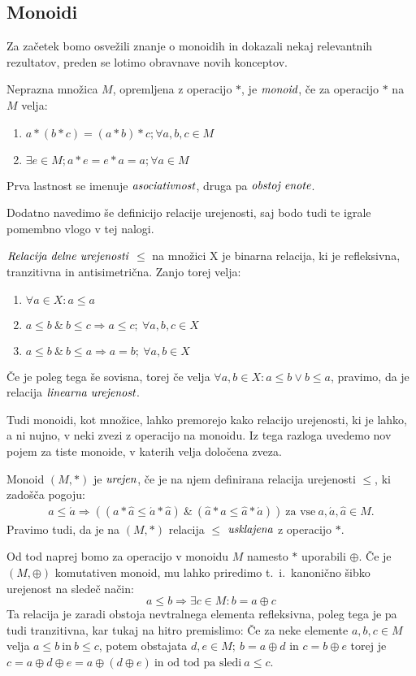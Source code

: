 \documentclass[mat1]{fmfdelo}
\newcommand{\pojem}[1]{\ensuremath{\emph{#1}}}
\begin{document}
\subsection{Monoidi}\label{subsect:monoid}
Za začetek bomo osvežili znanje o monoidih in dokazali nekaj relevantnih rezultatov, preden se lotimo obravnave novih konceptov. 
\begin{definicija}
	Neprazna množica $M$, opremljena z operacijo $\ast$, je \pojem{monoid}, če za operacijo $\ast$ na $M$ velja:
	\begin{enumerate}
		\item $a \ast (b \ast c) = (a\ast b) \ast c;\forall a, b, c \in M$
		\item $\exists e\in M; a \ast e = e\ast a = a;\forall a\in M$
	\end{enumerate}
	Prva lastnost se imenuje \pojem{asociativnost}, druga pa \pojem{obstoj enote}. 
\end{definicija}
Dodatno navedimo še definicijo relacije urejenosti, saj bodo tudi te igrale pomembno vlogo v tej nalogi.
\begin{definicija}
	\pojem{Relacija delne urejenosti} $\leq$ na množici X je binarna relacija, ki je refleksivna, tranzitivna in antisimetrična. Zanjo torej velja:
	\begin{enumerate}
		\item $\forall a \in X: a \leq a$
		\item $a\leq b~\&~b\leq c \Rightarrow a\leq c;~\forall a, b, c\in X$
		\item $a\leq b~\&~b\leq a \Rightarrow a = b;~\forall a, b\in X$
	\end{enumerate}
Če je poleg tega še sovisna, torej če velja $\forall a, b \in X: a \leq b \lor b \leq a$, pravimo, da je relacija \pojem{linearna urejenost}.
\end{definicija}
Tudi monoidi, kot množice, lahko premorejo kako relacijo urejenosti, ki je lahko, a ni nujno, v neki zvezi z operacijo na monoidu. Iz tega razloga uvedemo nov pojem za tiste monoide, v katerih velja določena zveza.
\begin{definicija}
	Monoid $(M, \ast)$ je \pojem{urejen}, če je na njem definirana relacija urejenosti $\leq$, ki zadošča pogoju: \begin{align*} 
	a \leq \acute{a} \Rightarrow ((a \ast \hat{a} \leq \acute{a} \ast \hat{a})~\&~(\hat{a} \ast a \leq \hat{a}\ast \acute{a})) ~\text{za vse}~a, \acute{a},\hat{a}\in M.
\end{align*}
	Pravimo tudi, da je na $(M, \ast)$ relacija $\leq$ \pojem{usklajena} z operacijo $\ast$.
\end{definicija}
Od tod naprej bomo za operacijo v monoidu $M$ namesto $\ast$ uporabili $\oplus$.
Če je $(M, \oplus)$ komutativen monoid, mu lahko priredimo t.~i.~kanonično šibko urejenost na sledeč način: $$a \leq b \Rightarrow \exists c\in M: b = a \oplus c$$ Ta relacija je zaradi obstoja nevtralnega elementa refleksivna, poleg tega je pa tudi tranzitivna, kar tukaj na hitro premislimo: Če za neke elemente $a, b, c\in M$ velja $a\leq b~\text{in}~b\leq c$, potem obstajata $d, e\in M;~b = a \oplus d$ in $c = b\oplus e$ torej je $c = a\oplus d\oplus e = a\oplus (d \oplus e)~\text{in od tod pa sledi}~ a \leq c$.
	
\end{document}
